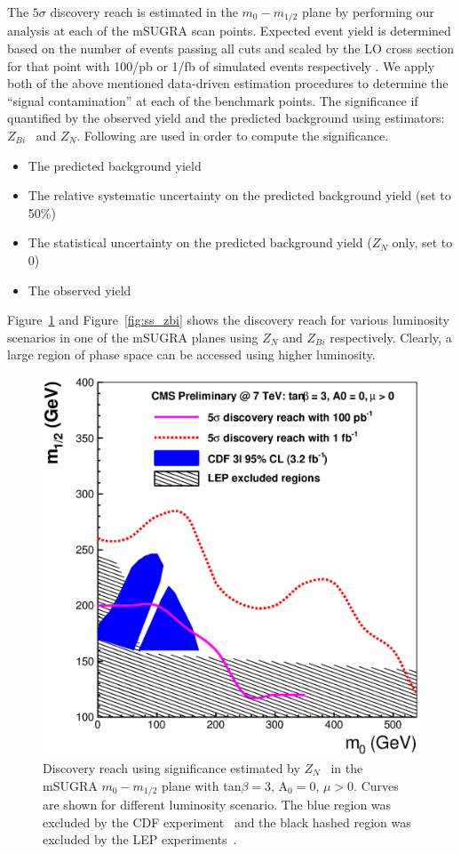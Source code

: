 The $5\sigma$  discovery reach is estimated in the $m_{0}-m_{1/2}$
plane by  performing our analysis at each of the  mSUGRA scan points.
Expected event yield is determined based on the number of events passing
all cuts and scaled by the LO cross section for that point with 100/pb or 1/fb
of simulated events respectively . We apply both of the above mentioned data-driven 
estimation procedures to determine the ``signal contamination'' at each of the benchmark points. 
The significance if quantified by the observed yield and the predicted background
using estimators: $Z_{Bi}$~\cite{cite:cousins}  and $Z_{N}$\cite{cite:conway}. Following
are used in order to compute the significance.
\begin{itemize}
\item The predicted background yield
\item The relative systematic  uncertainty on the predicted background
yield (set to 50\%)
\item The  statistical uncertainty  on the predicted  background yield
($Z_N$ only, set to 0)
\item The observed yield
\end{itemize}
Figure~\ref{fig:ss_zn} and Figure~\ref{fig:ss_zbi} shows the discovery reach for various 
luminosity scenarios in one of the mSUGRA planes using $Z_{N}$ and $Z_{Bi}$ respectively.
Clearly, a large region of phase space can be accessed using higher luminosity. 
\vspace{3 mm}
\begin{figure}[htb]
\begin{center}
\includegraphics[width=0.7\linewidth]{figs/massreachss_zn.eps}
\caption{Discovery reach using significance estimated by $Z_N$~\cite{cite:conway} 
in the mSUGRA $m_{0}-m_{1/2}$ plane with tan$\beta = 3$, A$_0 = 0$, $\mu > 0$. 
Curves are shown for different luminosity scenario. The blue region was excluded by 
the CDF experiment~\cite{cdf:recentSusy} and the black hashed region was excluded by the LEP 
experiments~\cite{lep:lepsusyreach}.\label{fig:ss_zn}}
\end{center}
\end{figure}
